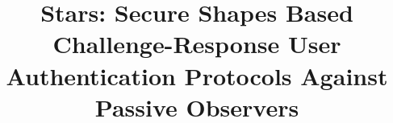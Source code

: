 \title{Stars: Secure Shapes Based Challenge-Response User Authentication Protocols Against Passive Observers}